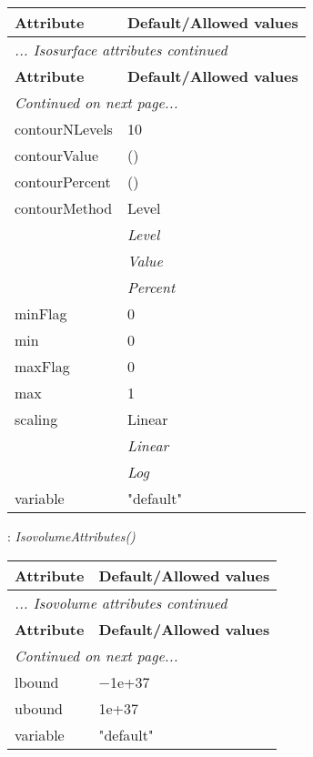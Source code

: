 \documentclass[10pt,a4paper]{report}
\begin{document}
\begin{longtable}{ll}
{\bf Attribute} & {\bf Default/Allowed values} \\
\hline \hline
\endfirsthead
\multicolumn{2}{l}{{\it ... Isosurface attributes continued}} \\
{\bf Attribute} & {\bf Default/Allowed values} \\
\hline \hline
\endhead
\hline
\multicolumn{2}{l}{{\it Continued on next page...}} \\
\endfoot
\hline
\endlastfoot

contourNLevels  &  10 \\
contourValue  &  () \\
contourPercent  &  () \\
contourMethod  &  Level   \\
 & {\it  Level} \\
 & {\it  Value} \\
 & {\it  Percent} \\
minFlag  &  0 \\
min  &  0 \\
maxFlag  &  0 \\
max  &  1 \\
scaling  &  Linear   \\
 & {\it  Linear} \\
 & {\it  Log} \\
variable  &  "default" \\
\end{longtable}

\newpage

{}
: {\it IsovolumeAttributes() }\\[-3mm]

\begin{longtable}{ll}
{\bf Attribute} & {\bf Default/Allowed values} \\
\hline \hline
\endfirsthead
\multicolumn{2}{l}{{\it ... Isovolume attributes continued}} \\
{\bf Attribute} & {\bf Default/Allowed values} \\
\hline \hline
\endhead
\hline
\multicolumn{2}{l}{{\it Continued on next page...}} \\
\endfoot
\hline
\endlastfoot

lbound  &  $-$1e+37 \\
ubound  &  1e+37 \\
variable  &  "default" \\
\end{longtable}
\end{document}
